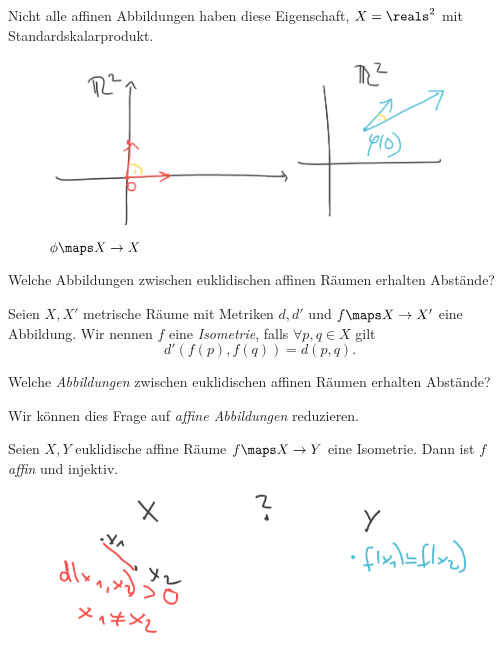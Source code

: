 Nicht alle affinen Abbildungen haben diese Eigenschaft, \zb \( X=\reals^2 \) mit Standardskalarprodukt.
\begin{figure}[H]
  \centering
  \includegraphics[width=0.5\linewidth]{figures/aehnlichkeiten_gegenbeispiel}
  \caption*{\( \phi\maps X\to X \)}
  \label{fig:aehnlichkeiten_gegenbeispiel}
\end{figure}
\begin{frage*}
  Welche Abbildungen zwischen euklidischen affinen Räumen erhalten Abstände?
\end{frage*}
\begin{definition*}
  Seien \( X,X' \) metrische Räume mit Metriken \( d,d' \) und \( f\maps X\to X' \) eine Abbildung. Wir nennen \( f \) eine \emph{Isometrie}, falls \( \forall p,q\in X \) gilt
  \begin{equation*}
    d'(f(p),f(q))=d(p,q).
  \end{equation*}
\end{definition*}
\begin{frage*}
  Welche \emph{Abbildungen} zwischen euklidischen affinen Räumen erhalten Abstände?

  \tto Wir können dies Frage auf \emph{affine Abbildungen} reduzieren.
\end{frage*}
\begin{satz}\label{isometrie_affin_und_injektiv}
  Seien \( X,Y \) euklidische affine Räume \( f\maps X\to Y \) eine Isometrie. Dann ist \( f \) \emph{affin} und injektiv.
  \begin{figure}[H]
    \centering
    \includegraphics[width=0.5\linewidth]{figures/isometrie_wirklich_injektiv}
    \label{fig:isometrie_wirklich_injektiv}
  \end{figure}
\end{satz}

